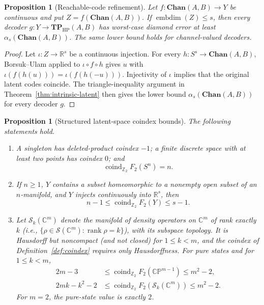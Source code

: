 \documentclass[11pt,a4paper]{article}
\theoremstyle{definition}
\theoremstyle{plain}
\newtheorem{proposition}[theorem]{Proposition}
\theoremstyle{remark}
\DeclareMathOperator{\embdim}{embdim}
\newcommand{\Chan}{\mathbf{Chan}}
\newcommand{\Sstate}{\mathcal{S}}
\newcommand{\TPHP}{\mathbf{TP}_{\mathrm{HP}}}
\begin{document}
\begin{proposition}[Reachable-code refinement]
\label{prop:reachable}
Let $f:\Chan(A,B)\to Y$ be continuous and put
$Z=f(\Chan(A,B))$. If $\embdim(Z)\leq s$, then every decoder
$g:Y\to\TPHP(A,B)$ has worst-case diamond error at least
$\alpha_s(\Chan(A,B))$. The same lower bound holds for channel-valued
decoders.
\end{proposition}

\begin{proof}
Let $\iota:Z\to\mathbb R^s$ be a continuous injection. For every
$h:S^s\to\Chan(A,B)$, Borsuk--Ulam applied to
$\iota\circ f\circ h$ gives $u$ with
$\iota(f(h(u)))=\iota(f(h(-u)))$. Injectivity of $\iota$ implies that the
original latent codes coincide. The triangle-inequality argument in
Theorem~\ref{thm:intrinsic-latent} then gives the lower bound
$\alpha_s(\Chan(A,B))$ for every decoder $g$.
\end{proof}

\begin{proposition}[Structured latent-space coindex bounds]
\label{prop:structured-coindex}
The following statements hold.
\begin{enumerate}
\item A singleton has deleted-product coindex $-1$; a finite discrete space
with at least two points has coindex $0$; and
\[
\operatorname{coind}_{\mathbb Z_2}F_2(S^n)=n.
\]
\item If $n\geq1$, $Y$ contains a subset homeomorphic to a nonempty open
subset of an $n$-manifold, and $Y$ injects continuously into
$\mathbb R^s$, then
\[
n-1\leq\operatorname{coind}_{\mathbb Z_2}F_2(Y)\leq s-1.
\]
\item Let $\mathcal S_k(\mathbb C^m)$ denote the manifold of
density operators on $\mathbb C^m$ of rank exactly $k$ (i.e., $\{\rho\in\Sstate(\mathbb C^m):\operatorname{rank}\rho=k\}$), with its subspace topology. It is Hausdorff but noncompact (and not closed) for $1\le k<m$, and the coindex of Definition~\ref{def:coindex} requires only Hausdorffness. For pure
states and for $1\leq k<m$,
\begin{align*}
2m-3
&\leq\operatorname{coind}_{\mathbb Z_2}
F_2(\mathbb{CP}^{m-1})\leq m^2-2,\\
2mk-k^2-2
&\leq\operatorname{coind}_{\mathbb Z_2}
F_2(\mathcal S_k(\mathbb C^m))\leq m^2-2.
\end{align*}
For $m=2$, the pure-state value is exactly $2$.
\end{enumerate}
\end{proposition}
\end{document}
